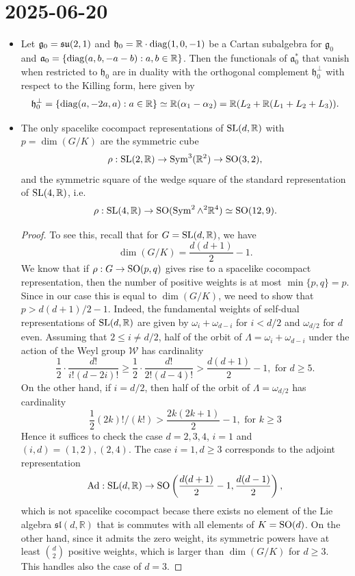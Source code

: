 \documentclass{report}
\begin{document}
\section{2025-06-20}
\begin{itemize}
\item Let $\mathfrak g_0 = \operatorname{{\mathfrak{su}}}(2,1)$ and $\mathfrak h_0 = \mathbb R \cdot \operatorname{diag}(1,0,-1)$ be a Cartan subalgebra for $\mathfrak g_0$ and $\mathfrak a_0 = \left\{ \operatorname{diag}(a,b,-a-b) : a, b \in \mathbb R \right\}$.
Then the functionals of $\mathfrak a_0^*$ that vanish when restricted to $\mathfrak h_0$ are in duality with the orthogonal complement $\mathfrak h_0^\perp$ with respect to the Killing form, here given by 
\[
\mathfrak h_0^\perp = \left\{ \operatorname{diag}(a, -2a, a) : a \in \mathbb R \right\} \simeq \mathbb R (\alpha_1 - \alpha_2) = \mathbb R (L_2 + \mathbb R (L_1 + L_2 + L_3)).
\]
\item The only spacelike cocompact representations of $\operatorname{{\mathrm{SL}}}(d,\mathbb R)$ with $p = \dim(G/K)$ are the symmetric cube
\[
\rho:\operatorname{{\mathrm{SL}}}(2,\mathbb R) \to \operatorname{Sym}^3(\mathbb R^2) \to \operatorname{{\mathrm{SO}}}(3,2),
\]
and the symmetric square of the wedge square of the standard representation of $\operatorname{{\mathrm{SL}}}(4,\mathbb R)$, i.e.\ 
\[
\rho: \operatorname{{\mathrm{SL}}}(4,\mathbb R) \to \operatorname{{\mathrm{SO}}}(\operatorname{Sym}^2 \wedge^2 \mathbb R^4) \simeq \operatorname{{\mathrm{SO}}}(12,9).
\]
\begin{proof}
To see this, recall that for $G = \operatorname{{\mathrm{SL}}}(d,\mathbb R)$, we have
\[
\dim(G/K) = \frac{d(d+1)}{2}-1.
\]
We know that if $\rho: G \to \operatorname{{\mathrm{SO}}}(p,q)$ gives rise to a spacelike cocompact representation, then the number of positive weights is at most $\min\{p,q\}=p$.
Since in our case this is equal to $\dim(G/K)$, we need to show that $p > d(d+1)/2 - 1$.
Indeed, the fundamental weights of self-dual representations of $\operatorname{{\mathrm{SL}}}(d,\mathbb R)$ are given by $\omega_i + \omega_{d-i}$ for $i<d/2$ and $\omega_{d/2}$ for $d$ even.
Assuming that $2\leq i \neq d/2$, half of the orbit of $\Lambda = \omega_i + \omega_{d-i}$ under the action of the Weyl group $\mathcal W$ has cardinality
\[
\frac{1}{2} \cdot \frac{d!}{i!(d-2i)!} \geq \frac{1}{2} \cdot \frac{d!}{2!(d-4)!} > \frac{d(d+1)}{2} - 1, \text{ for } d \geq 5.
\]
On the other hand, if $i = d/2$, then half of the orbit of $\Lambda = \omega_{d/2}$ has cardinality
\[
\frac{1}{2} (2k)!/(k!) > \frac{2k(2k+1)}{2} -1, \text{ for } k \geq 3
\]
Hence it suffices to check the case $d = 2,3,4$, $i=1$ and $(i,d) = (1,2), (2,4)$.
The case $i = 1, d \geq 3$ corresponds to the adjoint representation 
\[
\operatorname{Ad}: \operatorname{{\mathrm{SL}}}(d,\mathbb R) \to \operatorname{{\mathrm{SO}}}\left(\frac{d(d+1)}{2}-1, \frac{d(d-1)}{2}\right),
\]
which is not spacelike cocompact becase there exists no element of the Lie algebra $\mathfrak{sl}(d,\mathbb R)$ that is commutes with all elements of $K = \operatorname{{\mathrm{SO}}}(d)$.
On the other hand, since it admits the zero weight, its symmetric powers have at least $\binom{d}{2}$ positive weights, which is larger than $\dim(G/K)$ for $d \geq 3$.
This handles also the case of $d = 3$.


\end{proof}
\end{itemize}
\end{document}
